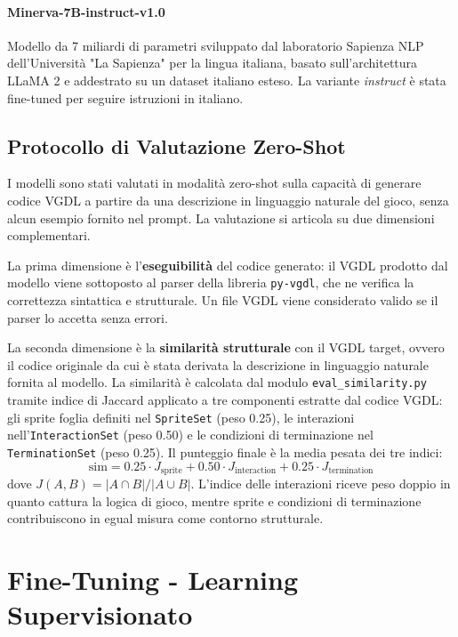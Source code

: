 \documentclass[final,5p,times,twocolumn]{elsarticle}
\begin{document}
\paragraph{Minerva-7B-instruct-v1.0} \citep{orlando2024minerva} Modello da 7 miliardi di parametri sviluppato dal laboratorio Sapienza NLP dell'Università "La Sapienza" per la lingua italiana, basato sull'architettura LLaMA 2 e addestrato su un dataset italiano esteso. La variante \textit{instruct} è stata fine-tuned per seguire istruzioni in italiano.

\subsection{Protocollo di Valutazione Zero-Shot}

I modelli sono stati valutati in modalità zero-shot sulla capacità di generare codice VGDL a partire da una descrizione in linguaggio naturale del gioco, senza alcun esempio fornito nel prompt. La valutazione si articola su due dimensioni complementari.

La prima dimensione è l'\textbf{eseguibilità} del codice generato: il VGDL prodotto dal modello viene sottoposto al parser della libreria \texttt{py-vgdl}, che ne verifica la correttezza sintattica e strutturale. Un file VGDL viene considerato valido se il parser lo accetta senza errori.

La seconda dimensione è la \textbf{similarità strutturale} con il VGDL target, ovvero il codice originale da cui è stata derivata la descrizione in linguaggio naturale fornita al modello. La similarità è calcolata dal modulo \texttt{eval\_similarity.py} tramite indice di Jaccard applicato a tre componenti estratte dal codice VGDL: gli sprite foglia definiti nel \texttt{SpriteSet} (peso 0.25), le interazioni nell'\texttt{InteractionSet} (peso 0.50) e le condizioni di terminazione nel \texttt{TerminationSet} (peso 0.25). Il punteggio finale è la media pesata dei tre indici:
\[
  \text{sim} = 0.25 \cdot J_\text{sprite} + 0.50 \cdot J_\text{interaction} + 0.25 \cdot J_\text{termination}
\]
dove $J(A, B) = |A \cap B| / |A \cup B|$. L'indice delle interazioni riceve peso doppio in quanto cattura la logica di gioco, mentre sprite e condizioni di terminazione contribuiscono in egual misura come contorno strutturale.

\section{Fine-Tuning - Learning Supervisionato}
\end{document}
